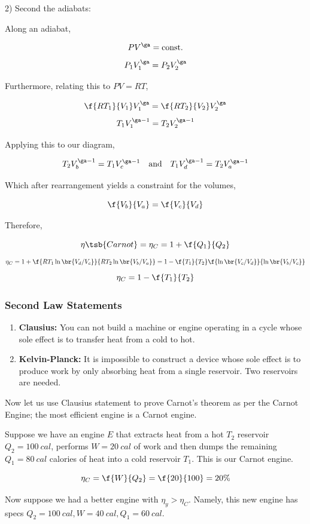 \documentclass{article}
\begin{document}
2) Second the adiabats:

Along an adiabat,

\[ PV^{\ga} = \text{const.}\]
\[ P_1V_1^{\ga} = P_2V_2^{\ga} \]

Furthermore, relating this to $PV = RT$,

\[ \f{RT_1}{V_1} V_1^{\ga} = \f{RT_2}{V_2} V_2^{\ga} \]
\[ T_1 V_1^{\ga-1} = T_2 V_2^{\ga-1} \]

Applying this to our diagram,

\[ T_2 V_b^{\ga-1} = T_1 V_c^{\ga-1} \quad \text{and} \quad T_1 V_d^{\ga-1} = T_2 V_a^{\ga-1} \]

Which after rearrangement yields a constraint for the volumes,

\[ \f{V_b}{V_a} = \f{V_c}{V_d} \]

Therefore,

\[ \eta\tsb{Carnot} = \eta_C = 1 + \f{Q_1}{Q_2} \]
\[ \eta_C = 1 + \f{RT_1\ln\br{V_d/V_c}}{RT_2\ln\br{V_b/V_a}} = 1 - \f{T_1}{T_2}\f{\ln\br{V_c/V_d}}{\ln\br{V_b/V_c}} \]
\[ \eta_C = 1 - \f{T_1}{T_2} \]

\subsubsection{Second Law Statements}

\begin{enumerate}
    \item \textbf{Clausius:} You can not build a machine or engine operating in a cycle whose sole effect is to transfer heat from a cold to hot.
    \item \textbf{Kelvin-Planck:} It is impossible to construct a device whose sole effect is to produce work by only absorbing heat from a single reservoir. Two reservoirs are needed.
\end{enumerate}

Now let us use Clausius statement to prove Carnot's theorem as per the Carnot Engine; the most efficient engine is a Carnot engine.


Suppose we have an engine $E$ that extracts heat from a hot $T_2$ reservoir $Q_2 = \SI{100}{cal}$, performs $W = \SI{20}{cal}$ of work and then dumps the remaining $Q_1 = \SI{80}{cal}$ calories of heat into a cold reservoir $T_1$. This is our Carnot engine.

\[ \eta_C = \f{W}{Q_2} = \f{20}{100} = 20\% \]

Now suppose we had a better engine with $\eta_y > \eta_C$. Namely, this new engine has specs $Q_2 = \SI{100}{cal}, W = \SI{40}{cal}, Q_1 = \SI{60}{cal}$.
\end{document}
